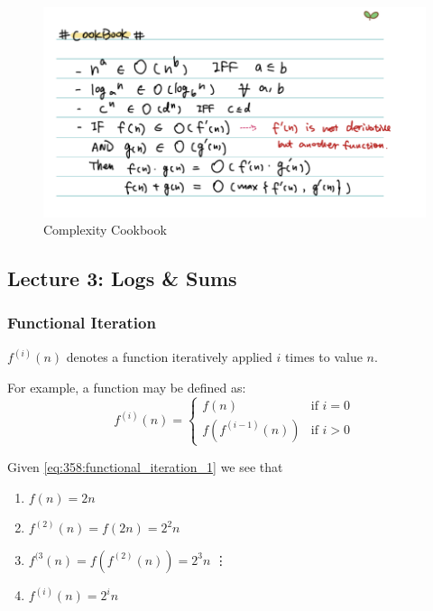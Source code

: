 \documentclass[../notes.tex]{subfiles}
\begin{document}
\begin{figure}[H]
	\centering
	\includegraphics[width=0.8\linewidth]{img/image_2022-09-13-00-26-01.png}
	\caption{Complexity Cookbook}
	\label{fig:358:complexity_cookbook}
\end{figure}

\subsection{Lecture 3: Logs \& Sums}



\subsubsection{Functional Iteration}

$ f^{(i)}(n) $  denotes a function iteratively applied $ i $ times to value $ n $.

For example, a function may be defined as:
\begin{equation}
	f^{(i)}(n) = 
	\begin{cases}
		f(n) & \text{if } i = 0 \\
		f(f^{(i-1)}(n)) & \text{if } i > 0
	\end{cases}
	\label{eq:358:functional_iteration_1}
\end{equation}


Given \eqref{eq:358:functional_iteration_1} we see that 

\begin{enumerate}
	\item $ f(n) = 2n $ 
	\item $ f^{(2)}(n) = f(2n) = 2^2n$ 
	\item $ f^{(3}(n) = f(f^{(2)}(n)) = 2^3n$ 
	\vdots
	\item $ f^{(i)}(n) = 2^in $
\end{enumerate}
\end{document}
